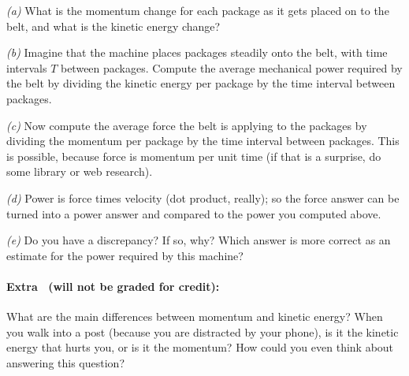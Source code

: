 \documentclass[12pt]{article}
\begin{document}
\textsl{(a)} What is the momentum change for each package as it
gets placed on to the belt, and what is the kinetic energy change?

\textsl{(b)} Imagine that the machine places packages steadily onto
the belt, with time intervals $T$ between packages. Compute the
average mechanical power required by the belt by dividing the kinetic
energy per package by the time interval between packages.

\textsl{(c)} Now compute the average force the belt is applying to the
packages by dividing the momentum per package by the time interval
between packages. This is possible, because force is momentum per unit
time (if that is a surprise, do some library or web research).

\textsl{(d)} Power is force times velocity (dot product, really); so
the force answer can be turned into a power answer and compared to the
power you computed above.

\textsl{(e)} Do you have a discrepancy? If so, why? Which answer is
more correct as an estimate for the power required by this machine?

\paragraph{Extra \problemname\ (will not be graded for credit):}%
What are the main differences between momentum and kinetic energy?
When you walk into a post (because you are distracted by your phone),
is it the kinetic energy that hurts you, or is it the momentum?
How could you even think about answering this question?
\end{document}
